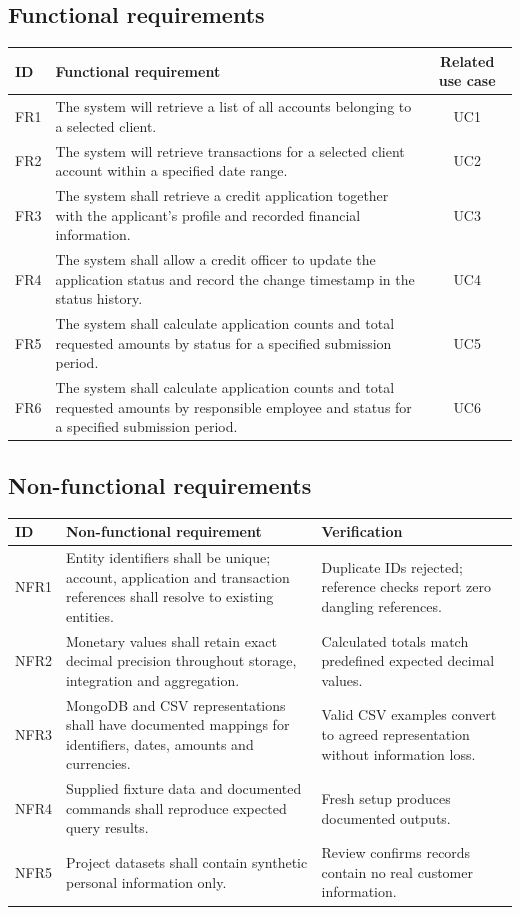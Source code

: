 \documentclass[11pt,a4paper]{article}
\begin{document}
\subsection{Functional requirements}
\begingroup
\renewcommand{\arraystretch}{1.2}
\begin{tabularx}{\textwidth}{@{}l >{\raggedright\arraybackslash}X c@{}}
\toprule
\textbf{ID} & \textbf{Functional requirement} & \textbf{Related use case}\\
\midrule
FR1 & The system will retrieve a list of all accounts belonging to a selected client. & UC1\\
FR2 & The system will retrieve transactions for a selected client account within a specified date range. & UC2\\
FR3 & The system shall retrieve a credit application together with the applicant's profile and recorded financial information. & UC3\\
FR4 & The system shall allow a credit officer to update the application status and record the change timestamp in the status history. & UC4\\
FR5 & The system shall calculate application counts and total requested amounts by status for a specified submission period. & UC5\\
FR6 & The system shall calculate application counts and total requested amounts by responsible employee and status for a specified submission period. & UC6\\
\bottomrule
\end{tabularx}
\endgroup

\subsection{Non-functional requirements}
\begingroup
\renewcommand{\arraystretch}{1.2}
\begin{tabularx}{\textwidth}{@{}l >{\raggedright\arraybackslash}X >{\raggedright\arraybackslash}p{4.3cm}@{}}
\toprule
\textbf{ID} & \textbf{Non-functional requirement} & \textbf{Verification}\\
\midrule
NFR1 & Entity identifiers shall be unique; account, application and transaction references shall resolve to existing entities. & Duplicate IDs rejected; reference checks report zero dangling references.\\
NFR2 & Monetary values shall retain exact decimal precision throughout storage, integration and aggregation. & Calculated totals match predefined expected decimal values.\\
NFR3 & MongoDB and CSV representations shall have documented mappings for identifiers, dates, amounts and currencies. & Valid CSV examples convert to agreed representation without information loss.\\
NFR4 & Supplied fixture data and documented commands shall reproduce expected query results. & Fresh setup produces documented outputs.\\
NFR5 & Project datasets shall contain synthetic personal information only. & Review confirms records contain no real customer information.\\
\bottomrule
\end{tabularx}
\endgroup
\end{document}
